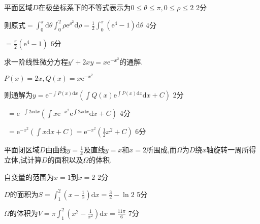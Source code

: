 \documentclass{NBUTExam}
\renewcommand{\d}{\mathrm{d}}
\newcommand{\e}{\mathrm{e}}
\newcommand{\dis}{\displaystyle}
\begin{document}
\begin{solution}
平面区域$D$在极坐标系下的不等式表示为$0\leqslant \theta \leqslant \pi,0\leqslant \rho \leqslant 2$
 \dotfill 2分 \par
\vspace{0.5em}

则原式$\dis =\int_0^\pi \d \theta \int_{0}^2 \rho \e^{\rho^2}\d \rho =\frac{1}{2}\int_0^\pi (\e^4-1)\d \theta$ \dotfill 4分 \par
\vspace{0.5em}
\qquad \quad $\dis =\frac{\pi}{2} (\e^4-1)$ \dotfill 6分 \par
\end{solution}
\vspace{17em}

\begin{problem}
求一阶线性微分方程$\dis y'+2xy=x\e^{-x^2}$的通解.
\end{problem}
\vspace{0.5em}

\begin{solution}
$\dis P(x)=2x,Q(x)=x\e^{-x^2}$
  \par
\vspace{0.5em}

则通解为$\dis y=\e^{-\int{P(x) \d x}}\left(\int{Q(x) \e^{\int{P(x)\d x}}\d x}+C\right)$  \dotfill 2分 \par
\vspace{0.5em}
\qquad \qquad $~~\dis =\e^{-\int{2x\d x}}\left( \int{x\e^{-x^2}\e^{\int{2x\d x}}\d x}+C \right) $ \dotfill 4分 \par
\vspace{0.5em}
\qquad \qquad $~~\dis =\e^{-x^2}\left( \int{x\d x}+C \right)=\e^{-x^2}\left(\frac{1}{2}x^2+C \right) $ \dotfill 6分 \par
\vspace{0.5em}
\end{solution}

\newpage
{}
\mifengxian

\begin{problem}
平面闭区域$D$由曲线$\dis y=\frac{1}{x}$及直线$y=x$和$x=2$所围成,而$\Omega$为$D$绕$x$轴旋转一周所得立体,试计算$D$的面积以及$\Omega$的体积.
\end{problem}
\vspace{0.5em}

\begin{solution}
自变量的范围为$x=1$到$x=2$
 \dotfill 2分 \par
\vspace{0.5em}

$D$的面积为$\dis S=\int_1^2 \left(x-\frac{1}{x}\right)\d x=\frac{3}{2}-\ln2$ \dotfill 5分 \par
\vspace{0.5em}
$\Omega$的体积为$\dis V=\pi\int_1^2 \left(x^2-\frac{1}{x^2}\right)\d x=\frac{11\pi}{6}$ \dotfill 7分 \par
\vspace{0.5em}
\end{solution}
\vspace{22em}
\end{document}
